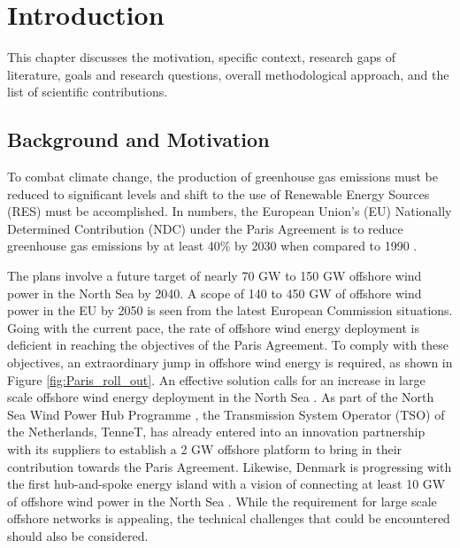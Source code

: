 \chapter{Introduction}\label{1}

This chapter discusses the motivation, specific context, research gaps of literature, goals and research questions, overall methodological approach, and the list of scientific contributions.

\section{Background and Motivation}\label{Background}

To combat climate change, the production of greenhouse gas emissions must be reduced to significant levels and shift to the use of Renewable Energy Sources (\gls{RES}) must be accomplished. In numbers, the European Union's (\gls{EU}) Nationally Determined Contribution (NDC) under the Paris Agreement is to reduce greenhouse gas emissions by at least 40\% by 2030 when compared to 1990 \cite{agreement2015unfccc}. 

The plans involve a future target of nearly 70 GW to 150 GW offshore wind power in the North Sea by 2040. A scope of 140 to 450 GW of offshore wind power in the \gls{EU} by 2050 is seen from the latest European Commission situations. Going with the current pace, the rate of offshore wind energy deployment is deficient in reaching the objectives of the Paris Agreement. To comply with these objectives, an extraordinary jump in offshore wind energy is required, as shown in Figure \ref{fig:Paris_roll_out}. An effective solution calls for an increase in large scale offshore wind energy deployment in the North Sea \cite{noauthor_vision_2020}. As part of the North Sea Wind Power Hub Programme \cite{noauthor_tennet_2020}, the Transmission System Operator (TSO) of the Netherlands, TenneT, has already entered into an innovation partnership with its suppliers to establish a 2 GW offshore platform to bring in their contribution towards the Paris Agreement. Likewise, Denmark is progressing with the first hub-and-spoke energy island with a vision of connecting at least 10 GW of offshore wind power in the North Sea \cite{noauthor_first_2020}. While the requirement for large scale offshore networks is appealing, the technical challenges that could be encountered should also be considered.  

